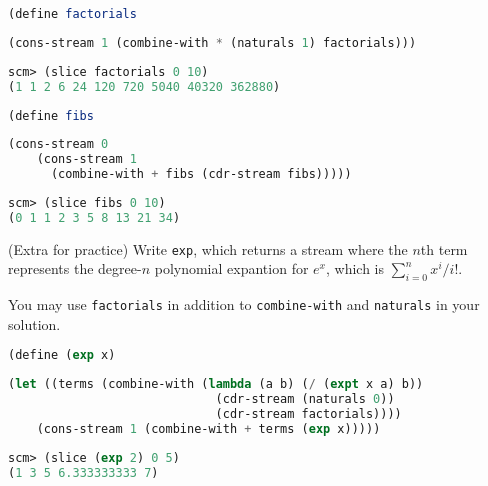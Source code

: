 \begin{subparts}
\subpart
\begin{lstlisting}[language=Scheme]
(define factorials
\end{lstlisting}
\begin{solution}[2.0in]
\begin{lstlisting}[language=Scheme]
  (cons-stream 1 (combine-with * (naturals 1) factorials)))
\end{lstlisting}
\end{solution}
\begin{lstlisting}[language=Scheme]
scm> (slice factorials 0 10)
(1 1 2 6 24 120 720 5040 40320 362880)
\end{lstlisting}

\subpart
\begin{lstlisting}[language=Scheme]
(define fibs
\end{lstlisting}
\begin{solution}[2.0in]
\begin{lstlisting}[language=Scheme]
  (cons-stream 0
    (cons-stream 1
      (combine-with + fibs (cdr-stream fibs)))))
\end{lstlisting}
\end{solution}
\begin{lstlisting}[language=Scheme]
scm> (slice fibs 0 10)
(0 1 1 2 3 5 8 13 21 34)
\end{lstlisting}

\subpart (Extra for practice) Write \texttt{exp}, which returns a stream where the $n$th term
represents the degree-$n$ polynomial expantion for $e^x$, which is
$\sum_{i=0}^{n} x^i / i!$.

You may use \texttt{factorials} in addition to \texttt{combine-with} and
\texttt{naturals} in your solution.
\begin{lstlisting}[language=Scheme]
(define (exp x)
\end{lstlisting}
\begin{solution}[2.0in]
\begin{lstlisting}[language=Scheme]
  (let ((terms (combine-with (lambda (a b) (/ (expt x a) b))
                             (cdr-stream (naturals 0))
                             (cdr-stream factorials))))
    (cons-stream 1 (combine-with + terms (exp x)))))
\end{lstlisting}
\end{solution}
\begin{lstlisting}[language=Scheme]
scm> (slice (exp 2) 0 5)
(1 3 5 6.333333333 7)
\end{lstlisting}
\end{subparts}
